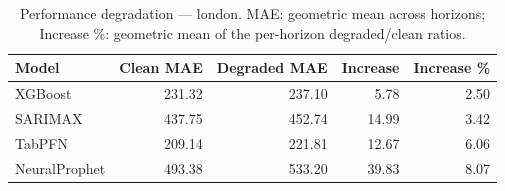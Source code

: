 \begin{table}[h]
\centering
\caption{Performance degradation — london. MAE: geometric mean across horizons; Increase \%: geometric mean of the per-horizon degraded/clean ratios.}
\label{tab:degradation_summary_london}
\begin{tabular}{lrrrr}
\toprule
Model & Clean MAE & Degraded MAE & Increase & Increase \% \\
\midrule
XGBoost & 231.32 & 237.10 & 5.78 & 2.50 \\
SARIMAX & 437.75 & 452.74 & 14.99 & 3.42 \\
TabPFN & 209.14 & 221.81 & 12.67 & 6.06 \\
NeuralProphet & 493.38 & 533.20 & 39.83 & 8.07 \\
\bottomrule
\end{tabular}
\end{table}
